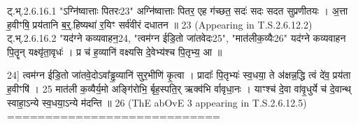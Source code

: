 \documentclass[17pt]{extarticle}
\begin{document}
ट्.भ्.2.6.16.1 "ऽग्नि॑ष्वात्ताः पितरः{23}" 
अग्नि॑ष्वात्ताः पितर॒ एह ग॑च्छत॒ सदः॑ सदः सदत सुप्रणीतयः । अ॒त्ता ह॒वीꣳषि॒ प्रय॑तानि ब॒र्॒.हिष्यथा॑ र॒यिꣳ सर्व॑वीरं दधातन ॥ {23}
(Appearing in T.S.2.6.12.2)
ट्.भ्.2.6.16.2 "यद॑ग्ने कव्यवाहन॒{24}, 
"त्वम॑ग्न ईडि॒तो जा॑तवेदः{25}", "मात॑लीक॒व्यैः{26}" 
यद॑ग्ने कव्यवाहन पि॒तॄन् यक्ष्यृ॑ता॒वृधः॑ । 
प्र च॑ ह॒व्यानि॑ वक्ष्यसि दे॒वेभ्य॑श्च पि॒तृभ्य॒ आ ॥ {24]
त्वम॑ग्न ईडि॒तो जा॑तवे॒दोऽवा᳚ड्ढ॒व्यानि॑ सुर॒भीणि॑ कृ॒त्वा । प्रादाः᳚ पि॒तृभ्यः॑ स्व॒धया॒ ते अ॑क्षन्न॒द्धि त्वं दे॑व॒ प्रय॑ता ह॒वीꣳषि॑ । {25}
मात॑ली क॒व्यैर्य॒मो अङ्गि॑रोभि॒ र्बृह॒स्पति॒र् ऋक्व॑भि र्वावृधा॒नः । याꣳश्च॑ दे॒वा वा॑वृ॒धुर्ये च॑ दे॒वान्थ् स्वाहा॒ऽन्ये स्व॒धया॒ऽन्ये म॑दन्ति ॥ {26}
(ThE abOvE 3 appearing in T.S.2.6.12.5)
============================ \newline
        \pagebreak
        
        
        
}
\end{document}
